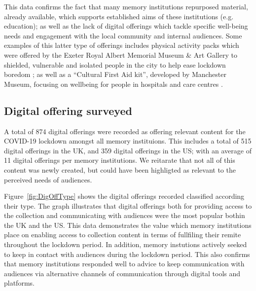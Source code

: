 \documentclass{egpubl}
\begin{document}
This data confirms the fact that many memory institutions repurposed material, already available, which supports established aims of these institutions (e.g. education); as well as the lack of digital offerings which tackle specific well-being needs and engagement with the local community and internal audiences. Some examples of this latter type of  offerings includes physical activity packs which were offered by the Exeter Royal Albert Memorial Museum \& Art Gallery to shielded, vulnerable and isolated people in the city to help ease lockdown boredom \cite{ex2020}; as well as a ``Cultural First Aid kit'', developed by Manchester Museum, focusing on wellbeing for people in hospitals and care centres \cite{man2020}. 




\subsection{Digital offering surveyed}
A total of 874 digital offerings were recorded as offering relevant content for the COVID-19 lockdown amongst all memory instituions. This includes a total of 515 digital offerings in the UK, and 359 digital offerings in the US; with an average of 11 digital offerings per memory institutions. We reitarate that not all of this content was newly created, but could have been highligted as relevant to the perceived needs of audiences. 



Figure~\ref{fig:DigOffType} shows the digital offerings recorded classified according their type. The graph illustrates that digital offerings both for providing access to the collection and communicating with audiences were the most popular bothin the UK and the US. This data demonstrates the value which memory institutions place on enabling access to collection content in terms of fullfiling their remite throughout the lockdown period. In addition, memory instutions actively seeked to keep in contact with audiences during the lockdown period. This also confirms that memory institutions responded well to advice to keep communication with audiences via alternative channels of communication through digital tools and platforms. 
\end{document}
